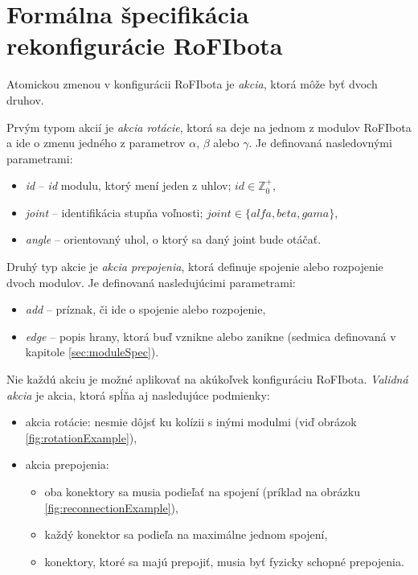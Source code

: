 \documentclass[
  digital, %
  oneside, %
  table,   %
  lof,     %
  nolot,     %
]{fithesis3}
\begin{document}
\section{Formálna špecifikácia rekonfigurácie RoFIbota}
\label{sec:formalRecfg}
Atomickou zmenou v konfigurácii RoFIbota je \textit{akcia}, ktorá môže byť dvoch druhov. 

Prvým typom akcií je \textit{akcia rotácie}, ktorá sa deje na jednom z modulov RoFIbota a ide o zmenu jedného z parametrov $\alpha$, $\beta$ alebo $\gamma$. Je definovaná nasledovnými parametrami: 
\begin{itemize}
    \item \textit{id} -- \textit{id} modulu, ktorý mení jeden z uhlov; $id \in \mathbb{Z}_0^+$, 
    \item \textit{joint} -- identifikácia stupňa voľnosti; $joint \in \{alfa, beta, gama\}$, 
    \item \textit{angle} -- orientovaný uhol, o ktorý sa daný joint bude otáčať. 
\end{itemize}

Druhý typ akcie je \textit{akcia prepojenia}, ktorá definuje spojenie alebo rozpojenie dvoch modulov. Je definovaná nasledujúcimi parametrami: 
\begin{itemize}
    \item \textit{add} -- príznak, či ide o spojenie alebo rozpojenie,
    \item \textit{edge} -- popis hrany, ktorá buď vznikne alebo zanikne (sedmica definovaná v kapitole \ref{sec:moduleSpec}). 
\end{itemize}

Nie každú akciu je možné aplikovať na akúkoľvek konfiguráciu RoFIbota. \textit{Validná akcia} je akcia, ktorá spĺňa aj nasledujúce podmienky:
\begin{itemize}
    \item akcia rotácie: nesmie dôjsť ku kolízii s inými modulmi (viď obrázok \ref{fig:rotationExample}), 
    \item akcia prepojenia: 
    \begin{itemize}[topsep=-5pt]
        \item oba konektory sa musia podieľať na spojení (príklad na obrázku \ref{fig:reconnectionExample}), 
        \item každý konektor sa podieľa na maximálne jednom spojení,
        \item konektory, ktoré sa majú prepojiť, musia byť fyzicky schopné prepojenia.
    \end{itemize}
\end{itemize}
\end{document}
